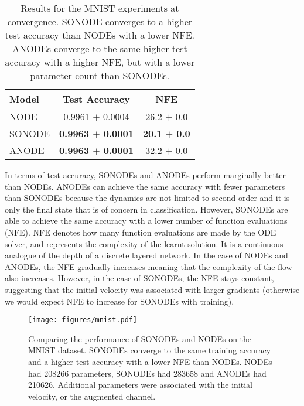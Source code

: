 \documentclass{article}
\theoremstyle{remark}
\theoremstyle{definition}
\begin{document}
\begin{table}[h!]
    \centering
    \caption{Results for the MNIST experiments at convergence. SONODE converges to a higher test accuracy than NODEs with a lower NFE. ANODEs converge to the same higher test accuracy with a higher NFE, but with a lower parameter count than SONODEs.}
    \label{tab: mnist}
    \begin{tabular}{l cc}
    \toprule
        Model &  Test Accuracy & NFE\\
    \midrule
    NODE  & 0.9961 $\pm$ 0.0004 & 26.2 $\pm$ 0.0\\
    SONODE  &  \textbf{0.9963 $\pm$ 0.0001} & \textbf{20.1 $\pm$ 0.0}\\
    ANODE & \textbf{0.9963 $\pm$ 0.0001} & 32.2 $\pm$ 0.0 \\ 
    \bottomrule
    \end{tabular}
\end{table}

In terms of test accuracy, SONODEs and ANODEs perform marginally better than NODEs. ANODEs can achieve the same accuracy with fewer parameters than SONODEs because the dynamics are not limited to second order and it is only the final state that is of concern in classification. However, SONODEs are able to achieve the same accuracy with a lower number of function evaluations (NFE). NFE denotes how many function evaluations are made by the ODE solver, and represents the complexity of the learnt solution. It is a continuous analogue of the depth of a discrete layered network. In the case of NODEs and ANODEs, the NFE gradually increases meaning that the complexity of the flow also increases. However, in the case of SONODEs, the NFE stays constant, suggesting that the initial velocity was associated with larger gradients (otherwise we would expect NFE to increase for SONODEs with training).


\begin{figure}[h]
    \centering
    \texttt{[image: figures/mnist.pdf]}
    \caption{Comparing the performance of SONODEs and NODEs on the MNIST dataset. SONODEs converge to the same training accuracy and a higher test accuracy with a lower NFE than NODEs. NODEs had 208266 parameters, SONODEs had 283658 and ANODEs had 210626. Additional parameters were associated with the initial velocity, or the augmented channel.}
    \label{fig: mnist}
\end{figure}
\end{document}
